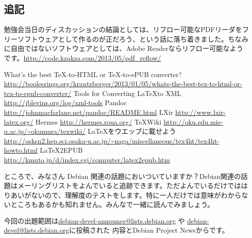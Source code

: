 \documentclass[mingoth,a4paper]{jsarticle}
\begin{document}
\subsection{追記}

勉強会当日のディスカッションの結論としては、リフロー可能なPDFリーダをフリーソフトウェアとして作るのが正だろう、という話に落ち着きました。ちなみに自由ではないソフトウェアとしては、Adobe Readerならリフロー可能なようです。\url{http://code.kzakza.com/2013/05/pdf_reflow/}


\begin{thebibliography}{0}
  What’s the best \TeX-to-HTML or \TeX-to-ePUB converter?
   \url{http://boolesrings.org/krautzberger/2013/01/05/whats-the-best-tex-to-html-or-tex-to-epub-converter/}
  Tools for Converting \LaTeX to XML
   \url{http://jblevins.org/log/xml-tools}
  Pandoc \url{http://johnmacfarlane.net/pandoc/README.html}
  LXir \url{http://www.lxir-latex.org/}
  Hermes \url{http://hermes.roua.org/}
  \TeX Wiki \url{http://oku.edu.mie-u.ac.jp/~okumura/texwiki/}
  \LaTeX をウエッブに載せよう
   \url{http://osksn2.hep.sci.osaka-u.ac.jp/~naga/miscellaneous/tex4ht/tex4ht-howto.html}
  \LaTeX2EPUB \url{http://kmuto.jp/d/index.cgi/computer/latex2epub.htm}
\end{thebibliography}


ところで、みなさん Debian 関連の話題においついていますか？Debian関連の話
題はメーリングリストをよんでいると追跡できます。ただよんでいるだけではは
りあいがないので、理解度のテストをします。特に一人だけでは意味がわからな
いところもあるかも知れません。みんなで一緒に読んでみましょう。

今回の出題範囲は\url{debian-devel-announce@lists.debian.org} や \url{debian-devel@lists.debian.org}に投稿された
内容とDebian Project Newsからです。

\begin{multicols}{2}



\end{multicols}

\printindex

\cleartoevenpage
\end{document}
